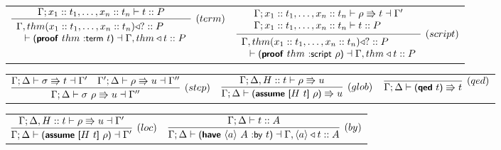 \documentclass{styles/sig-alternate-05-2015}
\newcommand{\kw}[1]{\textbf{#1}}
\newcommand{\code}[1]{\begin{sffamily}{\small #1}\end{sffamily}}
\newcommand{\mcode}[1]{\textrm{\code{#1}}}
\begin{document}
\begin{table*}
\begin{center}

\begin{tabular}{cc}
  $\infer[(term)]{\begin{array}{l}
            \Gamma,thm(x_1::t_1,\ldots,x_n::t_n)\triangleleft ?::P \\
            \hspace{8pt} \vdash \mcode{(\kw{proof}}~thm~\mcode{:term}~t\mcode{)} \dashv \Gamma,thm\triangleleft t::P
          \end{array}}{\Gamma;x_1::t_1,\ldots,x_n::t_n \vdash t :: P}$ &
$\infer[(script)]{\begin{array}{l}
            \Gamma,thm(x_1::t_1,\ldots,x_n::t_n)\triangleleft ?::P \\
            \hspace{8pt} \vdash \mcode{(\kw{proof}}~thm~\mcode{:script}~\rho\mcode{)} \dashv \Gamma,thm\triangleleft t::P
        \end{array}}{\begin{array}{l}
                       \Gamma;x_1::t_1,\ldots,x_n::t_n \vdash \rho \Rrightarrow t \dashv \Gamma'\\
                       \Gamma;x_1::t_1,\ldots,x_n::t_n \vdash t :: P
                     \end{array}}$

  \\[14pt]
\end{tabular}

\begin{tabular}{ccc}
  $\infer[(step)]{\Gamma;\Delta \vdash \sigma~\rho \Rrightarrow u \dashv \Gamma''}{\Gamma;\Delta\vdash \sigma \Rrightarrow t \dashv \Gamma'
  & \Gamma';\Delta \vdash \rho \Rrightarrow u \dashv \Gamma''}$ &
  $\infer[(glob)]{\Gamma;\Delta \vdash \mcode{(\kw{assume}}~\mcode{[}H~t\mcode{]}~\rho\mcode{)} \Rrightarrow u}
  {\Gamma;\Delta,H::t \vdash \rho \Rrightarrow u}$ &
  $\infer[(qed)]{\Gamma;\Delta \vdash \mcode{(\kw{qed}}~t\mcode{)} \Rrightarrow t}{}$ \\[14pt]
\end{tabular}


\begin{tabular}{cc}
  $\infer[(loc)]{\Gamma;\Delta \vdash \mcode{(\kw{assume}}~\mcode{[}H~t\mcode{]}~\rho\mcode{)} \dashv \Gamma'}
  {\Gamma;\Delta,H::t \vdash \rho \Rrightarrow u \dashv \Gamma'}$ &

  $\infer[(by)]{\Gamma;\Delta \vdash \mcode{(\kw{have}}~\langle a \rangle~A~\mcode{:by}~t\mcode{)} \dashv \Gamma,\langle a \rangle \triangleleft t::A}
  {\Gamma;\Delta \vdash t::A}$ \\[14pt]
\end{tabular}


\end{center}
\end{table*}
\end{document}

